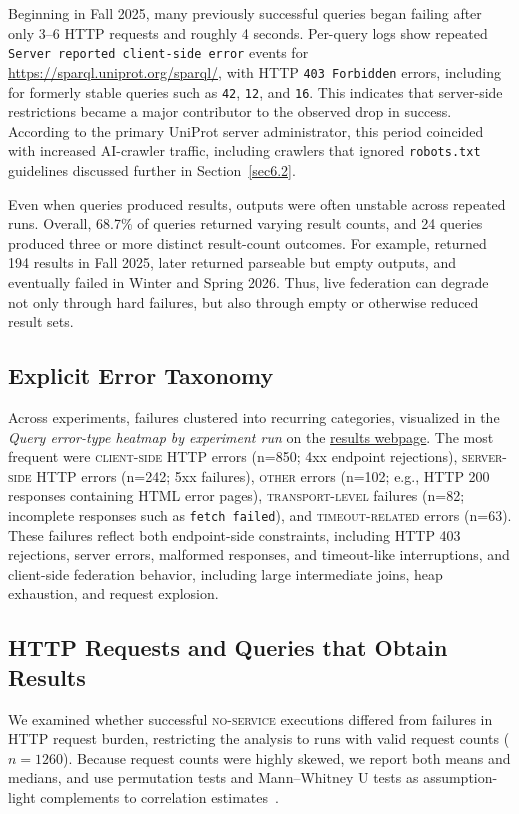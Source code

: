 \documentclass[runningheads]{llncs}
\begin{document}
Beginning in Fall 2025, many previously successful queries began failing after only 3--6 HTTP requests and roughly 4 seconds. 
Per-query logs show repeated \texttt{Server reported client-side error} events for \url{https://sparql.uniprot.org/sparql/}, with HTTP \texttt{403 Forbidden} errors, including for formerly stable queries such as \texttt{42}, \texttt{12}, and \texttt{16}. 
This indicates that server-side restrictions became a major contributor to the observed drop in success. 
According to the primary UniProt server administrator, this period coincided with increased AI-crawler traffic, including crawlers that ignored \texttt{robots.txt} guidelines discussed further in Section~\ref{sec6.2}.

Even when queries produced results, outputs were often unstable across repeated runs. 
Overall, 68.7\% of queries returned varying result counts, and 24 queries produced three or more distinct result-count outcomes. 
For example, \texttt{} returned 194 results in Fall 2025, later returned parseable but empty outputs, and eventually failed in Winter and Spring 2026. 
Thus, live federation can degrade not only through hard failures, but also through empty or otherwise reduced result sets.

\subsection{Explicit Error Taxonomy}\label{sec5.2}
Across experiments, failures clustered into recurring categories, visualized in the \textit{Query error-type heatmap by experiment run} on the \href{https://ecrum19.github.io/fed-survey-results/?mode=query&query=001&queryVariant=original}{results webpage}. 
The most frequent were \textsc{client-side HTTP} errors (n=850; 4xx endpoint rejections), \textsc{server-side HTTP} errors (n=242; 5xx failures), \textsc{other} errors (n=102; e.g., HTTP 200 responses containing HTML error pages), \textsc{transport-level} failures (n=82; incomplete responses such as \texttt{fetch failed}), and \textsc{timeout-related} errors (n=63). 
These failures reflect both endpoint-side constraints, including HTTP 403 rejections, server errors, malformed responses, and timeout-like interruptions, and client-side federation behavior, including large intermediate joins, heap exhaustion, and request explosion.

\subsection{HTTP Requests and Queries that Obtain Results}\label{sec5.3}
We examined whether successful \textsc{no-service} executions differed from failures in HTTP request burden, restricting the analysis to runs with valid request counts ($n=1260$). 
Because request counts were highly skewed, we report both means and medians, and use permutation tests and Mann--Whitney U tests as assumption-light complements to correlation estimates~\cite{altman1994quartiles,good2005permutation,mann1947test}.
\end{document}
